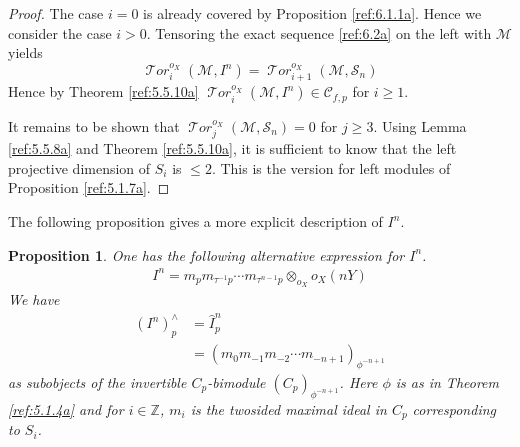\documentclass{amsproc}
\def \ZZ{{\mathbb Z}}
\def\Cscr{{\mathcal C}}
\def\Mscr{{\mathcal M}}
\def\Sscr{{\mathcal S}}
\def\Tscr{{\mathcal T}}
\def\HTor{\operatorname {\Tscr \mathit{or}}}
\def\HTor{\operatorname {\Tscr \mathit{or}}}
\newtheorem{propositions}[lemmas]{Proposition}
\theoremstyle{definition}
\theoremstyle{remark}
\numberwithin{equation}{section}
\numberwithin{table}{section}
\numberwithin{figure}{section}
\begin{document}
\begin{proof} The case $i=0$ is already covered by Proposition 
\ref{ref:6.1.1a}. Hence we consider the case $i>0$. Tensoring the exact
sequence \eqref{ref:6.2a} on the left with $\Mscr$ yields
\[
\HTor_i^{o_X}(\Mscr,{I^n})=\HTor_{i+1}^{o_X}(\Mscr,\Sscr_n)
\]
Hence by Theorem \ref{ref:5.5.10a} $\HTor_i^{o_X}(\Mscr,{I^n})\in \Cscr_{f,p}$ for $i\ge 1$.

It remains to be shown that $\HTor_j^{o_X}(\Mscr,\Sscr_n)=0$ for $j\ge 3$.
Using Lemma \ref{ref:5.5.8a} and Theorem \ref{ref:5.5.10a}, it is
sufficient to know that the left projective dimension of $S_i$ is $\le
2$. This is the version for left modules of  Proposition \ref{ref:5.1.7a}.
\end{proof}
The following proposition gives a more explicit description of
${I^n}$.
\begin{propositions} 
\label{ref:6.1.3a}
One has the following alternative expression for
${I^n}$. 
\begin{gather*}
{I^n}=m_{p}m_{\tau^{-1}p}\cdots m_{\tau^{n-1}p}\otimes_{o_X}
o_X(nY)
\end{gather*}
We have
\begin{align}
\label{ref:6.4a}
({I}^n)^\wedge_p&=\hat{I}^n_p\\
\label{ref:6.5a}
&=(m_0m_{-1}m_{-2}\cdots m_{-n+1})_{\phi^{-n+1}}
\end{align}
as subobjects of the invertible $C_p$-bimodule $(C_p)_{\phi^{-n+1}}$.
Here $\phi$ is as in Theorem \ref{ref:5.1.4a} and for $i\in\ZZ$,
$m_i$ is the twosided maximal ideal in $C_p$ corresponding to $S_i$.
\end{propositions}
\end{document}
